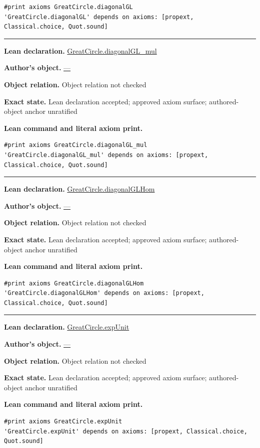\documentclass[11pt]{article}
\theoremstyle{plain}
\theoremstyle{definition}
\theoremstyle{remark}
\begin{document}
\begin{tcolorbox}
\begin{Verbatim}[breaklines=true,breakanywhere=true,fontsize=\small]
#print axioms GreatCircle.diagonalGL
'GreatCircle.diagonalGL' depends on axioms: [propext, Classical.choice, Quot.sound]
\end{Verbatim}
\medskip\hrule\medskip
\textbf{Lean declaration.} \url{GreatCircle.diagonalGL_mul}
\par\textbf{Author's object.} \url{—}
\par\textbf{Object relation.} Object relation not checked
\par\textbf{Exact state.} Lean declaration accepted; approved axiom surface; authored-object anchor unratified
\par\smallskip\textbf{Lean command and literal axiom print.}
\begin{Verbatim}[breaklines=true,breakanywhere=true,fontsize=\small]
#print axioms GreatCircle.diagonalGL_mul
'GreatCircle.diagonalGL_mul' depends on axioms: [propext, Classical.choice, Quot.sound]
\end{Verbatim}
\medskip\hrule\medskip
\textbf{Lean declaration.} \url{GreatCircle.diagonalGLHom}
\par\textbf{Author's object.} \url{—}
\par\textbf{Object relation.} Object relation not checked
\par\textbf{Exact state.} Lean declaration accepted; approved axiom surface; authored-object anchor unratified
\par\smallskip\textbf{Lean command and literal axiom print.}
\begin{Verbatim}[breaklines=true,breakanywhere=true,fontsize=\small]
#print axioms GreatCircle.diagonalGLHom
'GreatCircle.diagonalGLHom' depends on axioms: [propext, Classical.choice, Quot.sound]
\end{Verbatim}
\medskip\hrule\medskip
\textbf{Lean declaration.} \url{GreatCircle.expUnit}
\par\textbf{Author's object.} \url{—}
\par\textbf{Object relation.} Object relation not checked
\par\textbf{Exact state.} Lean declaration accepted; approved axiom surface; authored-object anchor unratified
\par\smallskip\textbf{Lean command and literal axiom print.}
\begin{Verbatim}[breaklines=true,breakanywhere=true,fontsize=\small]
#print axioms GreatCircle.expUnit
'GreatCircle.expUnit' depends on axioms: [propext, Classical.choice, Quot.sound]

\end{Verbatim}
\end{tcolorbox}
\end{document}
